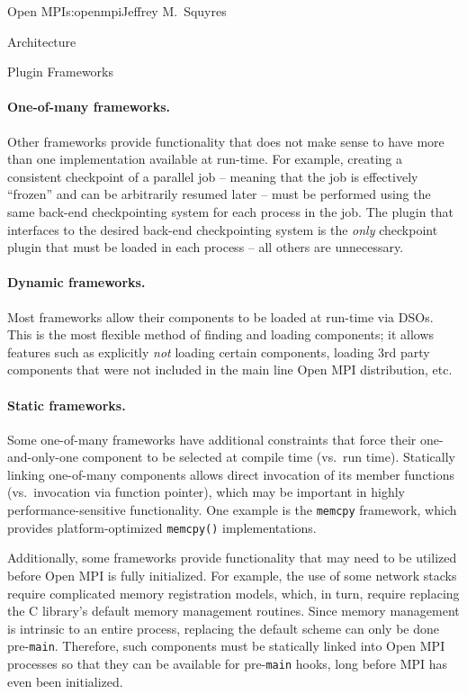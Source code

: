 \begin{aosachapter}{Open MPI}{s:openmpi}{Jeffrey M.\ Squyres}
\begin{aosasect1}{Architecture}
\begin{aosasect2}{Plugin Frameworks}

\paragraph{One-of-many frameworks.} 

Other frameworks provide functionality that does not make sense to
have more than one implementation available at run-time.
%
For example, creating a consistent checkpoint of a parallel job --
meaning that the job is effectively ``frozen'' and can be arbitrarily
resumed later -- must be performed using the same back-end
checkpointing system for each process in the job.
%
The plugin that interfaces to the desired back-end checkpointing
system is the \emph{only} checkpoint plugin that must be loaded in each
process -- all others are unnecessary.


\paragraph{Dynamic frameworks.} 

Most frameworks allow their components to be loaded at run-time via
DSOs.  This is the most flexible method of finding and loading
components; it allows features such as explicitly \emph{not} loading
certain components, loading 3rd party components that were not
included in the main line Open MPI distribution, etc.


\paragraph{Static frameworks.} 

Some one-of-many frameworks have additional constraints that force
their one-and-only-one component to be selected at compile time (vs.\
run time).  Statically linking one-of-many components allows direct
invocation of its member functions (vs.\ invocation via function
pointer), which may be important in highly performance-sensitive
functionality.  One example is the {\tt memcpy} framework, which
provides platform-optimized {\tt memcpy()} implementations.

Additionally, some frameworks provide functionality that may need to
be utilized before Open MPI is fully initialized.  
%
For example, the use of some network stacks require complicated memory
registration models, which, in turn, require replacing the C library's
default memory management routines.
%
Since memory management is intrinsic to an entire process, replacing
the default scheme can only be done pre-{\tt main}.
%
Therefore, such components must be statically linked into Open MPI
processes so that they can be available for pre-{\tt main} hooks, long
before MPI has even been initialized.


\end{aosasect2}
\end{aosasect1}
\end{aosachapter}
